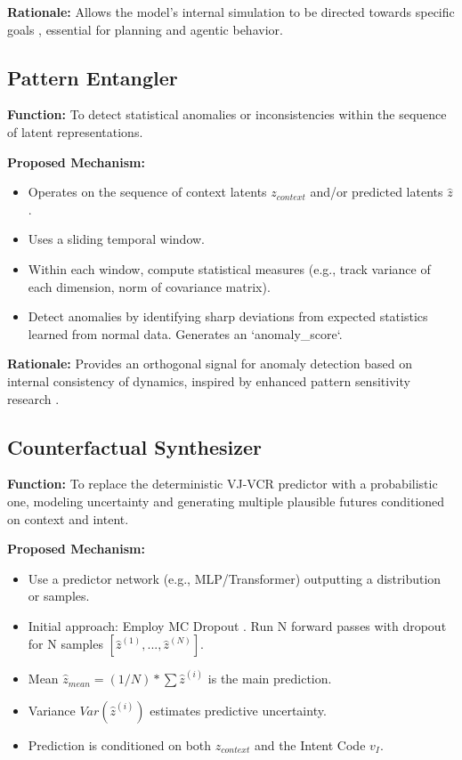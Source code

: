 \documentclass[11pt]{article}
\begin{document}
\textbf{Rationale:} Allows the model's internal simulation to be directed towards specific goals \cite{Puthoff1996, NRC1995}, essential for planning and agentic behavior.

\subsection{Pattern Entangler}
\textbf{Function:} To detect statistical anomalies or inconsistencies within the sequence of latent representations.

\textbf{Proposed Mechanism:}
\begin{itemize}
    \item Operates on the sequence of context latents $z_{context}$ and/or predicted latents $\hat{z}$.
    \item Uses a sliding temporal window.
    \item Within each window, compute statistical measures (e.g., track variance of each dimension, norm of covariance matrix).
    \item Detect anomalies by identifying sharp deviations from expected statistics learned from normal data. Generates an `anomaly_score`.
\end{itemize}

\textbf{Rationale:} Provides an orthogonal signal for anomaly detection based on internal consistency of dynamics, inspired by enhanced pattern sensitivity research \cite{Mottron2006, BaronCohen2009, Samson2011}.

\subsection{Counterfactual Synthesizer}
\textbf{Function:} To replace the deterministic VJ-VCR predictor with a probabilistic one, modeling uncertainty and generating multiple plausible futures conditioned on context and intent.

\textbf{Proposed Mechanism:}
\begin{itemize}
    \item Use a predictor network (e.g., MLP/Transformer) outputting a distribution or samples.
    \item Initial approach: Employ MC Dropout \cite{Gal2016}. Run N forward passes with dropout for N samples $[\hat{z}^{(1)}, ..., \hat{z}^{(N)}]$.
    \item Mean $\hat{z}_{mean} = (1/N) * \sum \hat{z}^{(i)}$ is the main prediction.
    \item Variance $Var(\hat{z}^{(i)})$ estimates predictive uncertainty.
    \item Prediction is conditioned on both $z_{context}$ and the Intent Code $v_I$.
\end{itemize}
\end{document}
